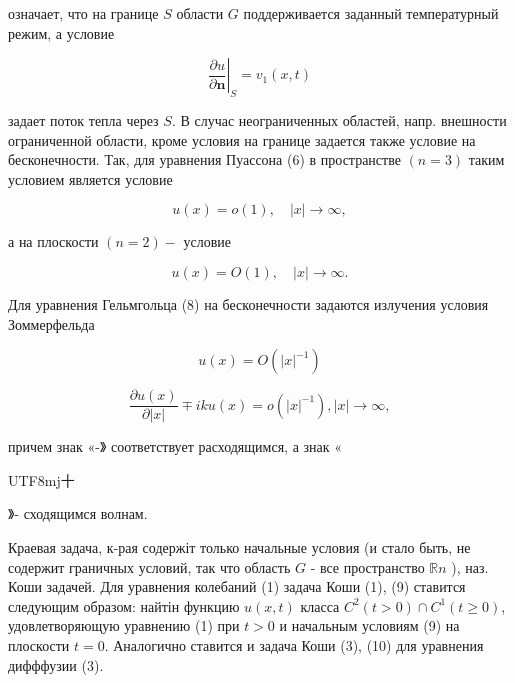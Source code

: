 \documentclass[10pt]{article}
\begin{document}
означает, что на границе $S$ области $G$ поддерживается заданный температурный режим, а условие



\[

\left.\frac{\partial u}{\partial \boldsymbol{n}}\right|_{S}=v_{1}(x, t)

\]



задает поток тепла через $S$. В случас неограниченных областей, напр. внешности ограниченной области, кроме условия на границе задается также условие на бесконечности. Так, для уравнения Пуассона (6) в пространстве $(n=3)$ таким условием является условие



\[

u(x)=o(1), \quad|x| \longrightarrow \infty,

\]



а на плоскости $(n=2)-$ условие



\[

u(x)=O(1), \quad|x| \longrightarrow \infty .

\]



Для уравнения Гельмгольца (8) на бесконечности задаются излучения условия Зоммерфельда



\[

u(x)=O\left(|x|^{-1}\right)

\]



\[

\frac{\partial u(x)}{\partial|x|} \mp i k u(x)=o\left(|x|^{-1}\right),|x| \rightarrow \infty,

\]



причем знак «-》 соответствует расходящимся, а знак «\begin{CJK}{UTF8}{mj}十\end{CJK}》- сходящимся волнам.



Краевая задача, к-рая содержіт только начальные условия (и стало быть, не содержит граничных условий, так что область $G$ - все пространство $\mathbb{R} n$ ), наз. Коши задачей. Для уравнения колебаний (1) задача Коши (1), (9) ставится следующим образом: найтін функцию $u(x, t)$ класса $C^{2}(t>0) \cap C^{1}(t \geqslant 0)$, удовлетворяющую уравнению (1) при $t>0$ и начальным условиям (9) на плоскости $t=0$. Аналогично ставится и задача Коши (3), (10) для уравнения дифффузии (3).
\end{document}

